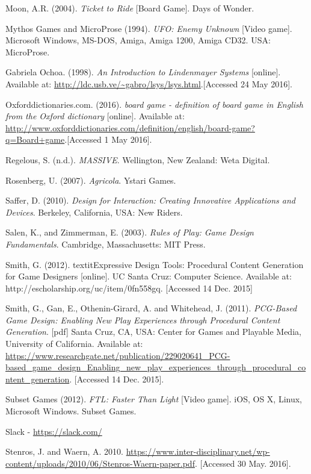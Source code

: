 \documentclass[a4paper,11pt]{report}
\begin{document}
\begin{thebibliography}{1}
Moon, A.R. (2004). \textit{Ticket to Ride} [Board Game]. Days of Wonder.

Mythos Games and MicroProse (1994). \textit{UFO: Enemy Unknown} [Video game]. Microsoft Windows, MS-DOS, Amiga, Amiga 1200, Amiga CD32. USA: MicroProse.

Gabriela Ochoa. (1998). \textit{An Introduction to Lindenmayer Systems} [online]. Available at:  \url{http://ldc.usb.ve/~gabro/lsys/lsys.html}.[Accessed 24 May 2016].

Oxforddictionaries.com. (2016). \textit{board game - definition of board game in English from the Oxford dictionary} [online]. Available at:  \url{http://www.oxforddictionaries.com/definition/english/board-game?q=Board+game}.[Accessed 1 May 2016].

Regelous, S. (n.d.). \textit{MASSIVE}. Wellington, New Zealand: Weta Digital.

Rosenberg, U. (2007). \textit{Agricola}. Ystari Games.

Saffer, D. (2010). \textit{Design for Interaction: Creating Innovative Applications and Devices}. Berkeley, California, USA: New Riders.

Salen, K., and Zimmerman, E. (2003). \textit{Rules of Play: Game Design Fundamentals}. Cambridge, Massachusetts: MIT Press.

Smith, G. (2012). textit{Expressive Design Tools: Procedural Content Generation for Game Designers} [online]. UC Santa Cruz: Computer Science. Available at: http://escholarship.org/uc/item/0fn558gq. [Accessed 14 Dec. 2015]

Smith, G., Gan, E., Othenin-Girard, A. and Whitehead, J. (2011). \textit{PCG-Based Game Design: Enabling New Play Experiences through Procedural Content Generation}. [pdf] Santa Cruz, CA, USA: Center for Games and Playable Media, University of California. Available at: \url{https://www.researchgate.net/publication/229020641_PCG-based_game_design_Enabling_new_play_experiences_through_procedural_content_generation}. [Accessed 14 Dec. 2015].

Subset Games (2012). \textit{FTL: Faster Than Light} [Video game]. iOS, OS X, Linux, Microsoft Windows. Subset Games.

Slack - \url{https://slack.com/}

Stenros, J. and Waern, A. 2010. \url{https://www.inter-disciplinary.net/wp-content/uploads/2010/06/Stenros-Waern-paper.pdf}. [Accessed 30 May. 2016].


\end{thebibliography}
\end{document}
